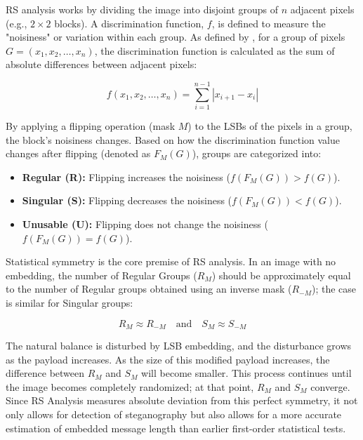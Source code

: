 RS analysis works by dividing the image into disjoint groups of $n$ 
adjacent pixels (e.g., $2 \times 2$ blocks). A discrimination function, $f$, 
is defined to measure the "noisiness" or variation within each group. As defined by 
\textcite{Fridrich2001}, for a group of pixels $G = (x_1, x_2, \dots, x_n)$, 
the discrimination function is calculated as the sum of absolute differences between adjacent pixels:

\begin{equation}
  f(x_1, x_2, \dots, x_n) = \sum_{i=1}^{n-1} |x_{i+1} - x_i|
\end{equation}

By applying a flipping operation (mask $M$) to the LSBs of the pixels in a group, the block's noisiness changes. Based on how the discrimination function value changes after flipping (denoted as $F_M(G)$), groups are categorized into:

\begin{itemize}
  \item \textbf{Regular (R):} Flipping increases the noisiness ($f(F_M(G)) > f(G)$).
  \item \textbf{Singular (S):} Flipping decreases the noisiness ($f(F_M(G)) < f(G)$).
  \item \textbf{Unusable (U):} Flipping does not change the noisiness ($f(F_M(G)) = f(G)$).
\end{itemize}

Statistical symmetry is the core premise of RS analysis. 
In an image with no embedding, the number of Regular Groups ($R_M$) should be approximately equal to the 
number of Regular groups obtained using an inverse mask ($R_{-M}$); the case is similar for Singular groups:

\begin{equation}
    R_M \approx R_{-M} \quad \text{and} \quad S_M \approx S_{-M}
\end{equation}


The natural balance is disturbed by LSB embedding, and the disturbance grows as the payload increases. 
As the size of this modified payload increases, the difference between $R_M$ and $S_M$ will become smaller. 
This process continues until the image becomes completely randomized; at that point, $R_M$ and $S_M$ converge. 
Since RS Analysis measures absolute deviation from this perfect symmetry, 
it not only allows for detection of steganography but also allows for a 
more accurate estimation of embedded message length than earlier first-order statistical tests.

